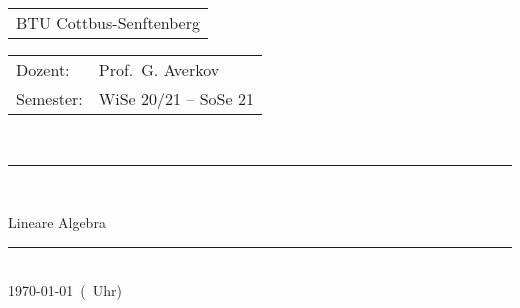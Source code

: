 
\begin{tabular}{l}
BTU Cottbus-Senftenberg
\end{tabular}

\vspace{2cm}

\begin{tabular}{ll}
	Dozent: & Prof.~G. Averkov
\\  Semester: & WiSe 20/21 -- SoSe 21
\end{tabular}
\vspace{3cm}
\\
\rule{\linewidth}{0.5mm}\\[0.4cm]
\begin{huge}
Lineare Algebra \\
\end{huge}
\rule{\linewidth}{0.5mm}\\[1.5cm]
%
\today\ (\thistime\ Uhr)




\thispagestyle{empty}


\newpage
